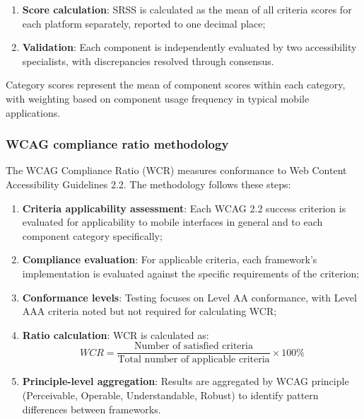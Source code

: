 \begin{enumerate}
    \item \textbf{Score calculation}: SRSS is calculated as the mean of all criteria scores for each platform separately, reported to one decimal place;
    
    \item \textbf{Validation}: Each component is independently evaluated by two accessibility specialists, with discrepancies resolved through consensus.
\end{enumerate}

Category scores represent the mean of component scores within each category, with weighting based on component usage frequency in typical mobile applications.

\subsubsection{WCAG compliance ratio methodology}
\label{subsubsec:wcr-methodology}

The WCAG Compliance Ratio (WCR) measures conformance to Web Content Accessibility Guidelines 2.2. The methodology follows these steps:

\begin{enumerate}
    \item \textbf{Criteria applicability assessment}: Each WCAG 2.2 success criterion is evaluated for applicability to mobile interfaces in general and to each component category specifically;
    
    \item \textbf{Compliance evaluation}: For applicable criteria, each framework's implementation is evaluated against the specific requirements of the criterion;
    
    \item \textbf{Conformance levels}: Testing focuses on Level AA conformance, with Level AAA criteria noted but not required for calculating WCR;
    
    \item \textbf{Ratio calculation}: WCR is calculated as:
    \begin{equation}
    WCR = \frac{\text{Number of satisfied criteria}}{\text{Total number of applicable criteria}} \times 100\%
    \end{equation}
    
    \item \textbf{Principle-level aggregation}: Results are aggregated by WCAG principle (Perceivable, Operable, Understandable, Robust) to identify pattern differences between frameworks.
\end{enumerate}

